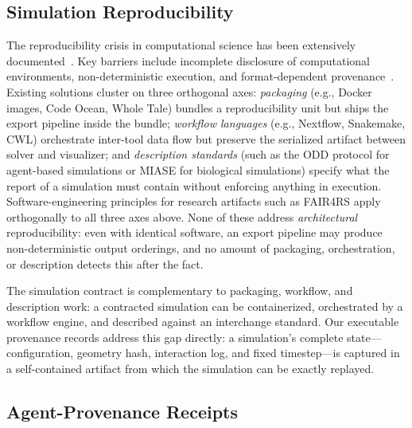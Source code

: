 \documentclass[journal]{IEEEtran}
\begin{document}
\subsection{Simulation Reproducibility}
\label{sec:related:reproducibility}

The reproducibility crisis in computational science has been extensively
documented~\cite{NAS2019,CACM2024,ReprodSurvey2024}. Key barriers include
incomplete disclosure of computational environments, non-deterministic
execution, and format-dependent provenance~\cite{FivePillars2023}.
Existing solutions cluster on three orthogonal axes:
\emph{packaging} (e.g., Docker images, Code Ocean, Whole Tale) bundles a
reproducibility unit but ships the export pipeline inside the bundle;
\emph{workflow languages} (e.g., Nextflow, Snakemake, CWL) orchestrate
inter-tool data flow but preserve the serialized artifact between
solver and visualizer;
and \emph{description standards} (such as the ODD protocol for
agent-based simulations or MIASE for biological simulations) specify
what the report of a simulation must contain
without enforcing anything in execution.
Software-engineering principles for research artifacts such as FAIR4RS
apply orthogonally to all three axes above.
None of these address \emph{architectural} reproducibility: even with
identical software, an export pipeline may produce non-deterministic
output orderings, and no amount of packaging, orchestration, or
description detects this after the fact.

The simulation contract is complementary to packaging, workflow, and
description work: a contracted simulation can be containerized,
orchestrated by a workflow engine, and described against an interchange
standard. Our executable provenance records address this gap
directly: a simulation's complete state---configuration, geometry
hash, interaction log, and fixed timestep---is captured in a
self-contained artifact from which the simulation can be exactly
replayed.


\subsection{Agent-Provenance Receipts}
\label{sec:related:agent-receipts}
\end{document}
